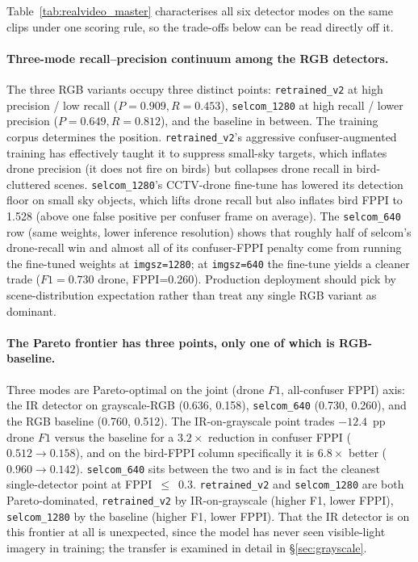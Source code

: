 \documentclass[12pt,a4paper,oneside,openright]{book}
\begin{document}
Table~\ref{tab:realvideo_master} characterises all six detector modes on the same clips under one scoring rule, so the trade-offs below can be read directly off it.

\paragraph{Three-mode recall--precision continuum among the RGB detectors.}
The three RGB variants occupy three distinct points: \texttt{retrained\_v2} at high precision / low recall ($P=0.909, R=0.453$), \texttt{selcom\_1280} at high recall / lower precision ($P=0.649, R=0.812$), and the baseline in between. The training corpus determines the position. \texttt{retrained\_v2}'s aggressive confuser-augmented training has effectively taught it to suppress small-sky targets, which inflates drone precision (it does not fire on birds) but collapses drone recall in bird-cluttered scenes. \texttt{selcom\_1280}'s CCTV-drone fine-tune has lowered its detection floor on small sky objects, which lifts drone recall but also inflates bird FPPI to 1.528 (above one false positive per confuser frame on average). The \texttt{selcom\_640} row (same weights, lower inference resolution) shows that roughly half of selcom's drone-recall win and almost all of its confuser-FPPI penalty come from running the fine-tuned weights at \texttt{imgsz=1280}; at \texttt{imgsz=640} the fine-tune yields a cleaner trade ($F1=0.730$ drone, FPPI=0.260). Production deployment should pick by scene-distribution expectation rather than treat any single RGB variant as dominant.

\paragraph{The Pareto frontier has three points, only one of which is RGB-baseline.}
Three modes are Pareto-optimal on the joint (drone $F1$, all-confuser FPPI) axis: the IR detector on grayscale-RGB (0.636, 0.158), \texttt{selcom\_640} (0.730, 0.260), and the RGB baseline (0.760, 0.512). The IR-on-grayscale point trades $-12.4$~pp drone $F1$ versus the baseline for a $3.2\times$ reduction in confuser FPPI ($0.512 \to 0.158$), and on the bird-FPPI column specifically it is $6.8\times$ better ($0.960 \to 0.142$). \texttt{selcom\_640} sits between the two and is in fact the cleanest single-detector point at FPPI~$\leq$~0.3. \texttt{retrained\_v2} and \texttt{selcom\_1280} are both Pareto-dominated, \texttt{retrained\_v2} by IR-on-grayscale (higher F1, lower FPPI), \texttt{selcom\_1280} by the baseline (higher F1, lower FPPI). That the IR detector is on this frontier at all is unexpected, since the model has never seen visible-light imagery in training; the transfer is examined in detail in \S\ref{sec:grayscale}.
\end{document}
